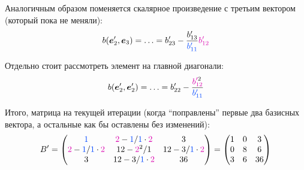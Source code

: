 \documentclass[a4paper,12pt]{article}
\begin{document}
\begin{example}
    Аналогичным образом поменяется скалярное произведение с третьим вектором (который пока не меняли):
    \[
      b(\bds e_2', \bds e_3) = \ldots = b'_{23} - \frac{b'_{13}}{\textcolor{blue}{b'_{11}}} \textcolor{pink}{b'_{12}}
    \]
    
    Отдельно стоит рассмотреть элемент на главной диагонали:
    \[
      b(\bds e_2', \bds e_2') = \ldots = b'_{22} - \frac{{\textcolor{pink}{b}}_{\textcolor{pink}{12}}^{\textcolor{pink}{\prime} 2}}{\textcolor{blue}{b'_{11}}}
    \]
    
    Итого, матрица на текущей итерации (когда ``поправлены'' первые два базисных вектора, а остальные как бы оставлены без изменений):
    \[
      B' = \begin{pmatrix}
        \textcolor{blue}{1}
          & \textcolor{pink}{2} - \textcolor{blue}{1}/\textcolor{blue}{1} \cdot \textcolor{pink}{2}
          & 3\\
        \textcolor{pink}{2} - \textcolor{blue}{1}/\textcolor{blue}{1} \cdot \textcolor{pink}{2}
          & 12 - {\textcolor{pink}{2}}^2/1
          & 12 - 3/\textcolor{blue}{1} \cdot \textcolor{pink}{2}\\
        3
          & 12 - 3/\textcolor{blue}{1} \cdot \textcolor{pink}{2}
          & 36
      \end{pmatrix} = \begin{pmatrix}
        1 & 0 & 3\\
        0 & 8 & 6\\
        3 & 6 & 36
      \end{pmatrix}
    \]
    

\end{example}
\end{document}
